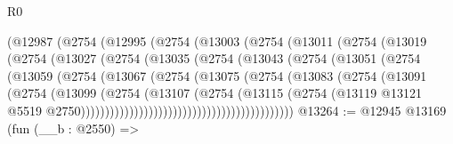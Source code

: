 \begin{lexlean}{R0}
\begin{coremodule}
                      (@12987
                        (@2754
                          (@12995
                            (@2754
                              (@13003
                                (@2754
                                  (@13011
                                    (@2754
                                      (@13019
                                        (@2754
                                          (@13027
                                            (@2754
                                              (@13035
                                                (@2754
                                                  (@13043
                                                    (@2754
                                                      (@13051
                                                        (@2754
                                                          (@13059
                                                            (@2754
                                                              (@13067
                                                                (@2754
                                                                  (@13075
                                                                    (@2754
                                                                      (@13083
                                                                        (@2754
                                                                          (@13091
                                                                            (@2754
                                                                              (@13099
                                                                                (@2754
                                                                                  (@13107
                                                                                    (@2754
                                                                                      (@13115
                                                                                        (@2754
                                                                                          (@13119
                                                                                            @13121
                                                                                            @5519
                                                                                            @2750))))))))))))))))))))))))))))))))))))))))))))
@13264 := @12945
    @13169
    (fun (__b : @2550) =>

\end{coremodule}
\end{lexlean}
